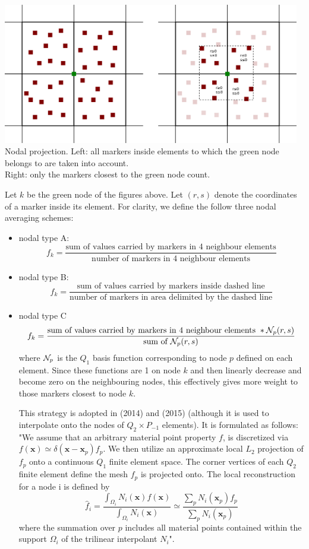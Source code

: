 \begin{center}
\includegraphics[width=13cm]{python_codes/fieldstone_13/images/markers2}\\
{\captionfont Nodal projection. 
Left: all markers inside elements to which the green node belongs to are taken into account.\\
Right: only the markers closest to the green node count.}
\end{center}

Let $k$ be the green node of the figures above. Let $(r,s)$ 
denote the coordinates of a marker inside its element.
For clarity, we define the follow three nodal averaging schemes:
\begin{itemize}
\item nodal type A: 
\[
f_k = \frac{\text{sum of values carried by markers in 4 neighbour elements}}
{\text{number of markers in 4 neighbour elements}}
\]
\item nodal type B: 
\[
f_k = \frac{\text{sum of values carried by markers inside dashed line}}
{\text{number of markers in area delimited by the dashed line}}
\]
\item nodal type C 
\[
f_k = \frac{\text{sum of values carried by markers in 4 neighbour elements } * {\mathcal{N}}_p(r,s)}
{\text{sum of }{\mathcal{N}}_p(r,s)} 
\]
where ${\mathcal{N}}_p$ is the $Q_1$ basis function corresponding to node $p$ 
defined on each element. Since these 
functions are 1 on node $k$ and then linearly decrease and become zero on 
the neighbouring nodes, this
effectively gives more weight to those markers closest to node $k$.

This strategy is adopted in \textcite{mabl14} (2014) and \textcite{mabl15} (2015) 
(although it is used to interpolate onto the nodes of $Q_2 \times P_{-1}$ elements). 
It is formulated as follows:\\
"We assume that an arbitrary material point property $f$, is discretized via 
$f(\bm x)\simeq \delta(\bm x - \bm x_p) f_p$. We then utilize an approximate local $L_2$ projection
of $f_p$ onto a continuous $Q_1$ finite element space. The corner vertices of
each $Q_2$ finite element define the mesh $f_p$ is projected onto.
The local reconstruction for a node i is defined by
\[
\hat{f}_i = \frac{\int_{\Omega_i}N_i(\bm x) f(\bm x)}{\int_{\Omega_i} N_i(\bm x)} \simeq
\frac{\sum_p N_i(\bm x_p) f_p }{\sum_p N_i(\bm x_p)}
\]
where the summation over $p$ includes all material points 
contained within the support $\Omega_i$ of the trilinear interpolant $N_i$".
\end{itemize}

